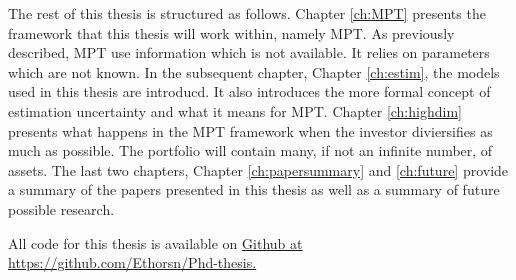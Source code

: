 The rest of this thesis is structured as follows. 
Chapter \ref{ch:MPT} presents the framework that this thesis will work within, namely MPT. 
As previously described, MPT use information which is not available. 
It relies on parameters which are not known. 
In the subsequent chapter, Chapter \ref{ch:estim}, the models used in this thesis are introducd. 
It also introduces the more formal concept of estimation uncertainty and what it means for MPT.
Chapter \ref{ch:highdim} presents what happens in the MPT framework when the investor diviersifies as much as possible.
The portfolio will contain many, if not an infinite number, of assets.
The last two chapters, Chapter \ref{ch:papersummary} and \ref{ch:future} provide a summary of the papers presented in this thesis as well as a summary of future possible research.

All code for this thesis is available on \href{https://github.com/Ethorsn/Phd-thesis}{Github at https://github.com/Ethorsn/Phd-thesis.}
